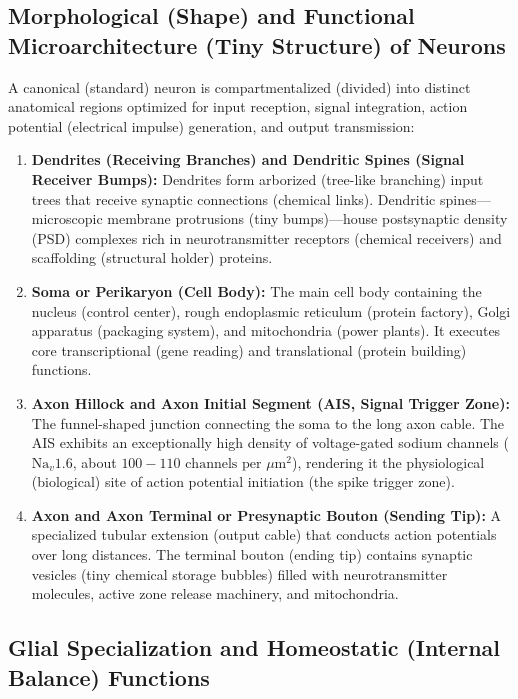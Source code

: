 \documentclass[10pt,journal,compsoc,onecolumn]{IEEEtran}
\begin{document}
\subsection{Morphological (Shape) and Functional Microarchitecture (Tiny Structure) of Neurons}

A canonical (standard) neuron is compartmentalized (divided) into distinct anatomical regions optimized for input reception, signal integration, action potential (electrical impulse) generation, and output transmission:

\begin{enumerate}
    \item \textbf{Dendrites (Receiving Branches) and Dendritic Spines (Signal Receiver Bumps):} Dendrites form arborized (tree-like branching) input trees that receive synaptic connections (chemical links). Dendritic spines—microscopic membrane protrusions (tiny bumps)—house postsynaptic density (PSD) complexes rich in neurotransmitter receptors (chemical receivers) and scaffolding (structural holder) proteins.
    \item \textbf{Soma or Perikaryon (Cell Body):} The main cell body containing the nucleus (control center), rough endoplasmic reticulum (protein factory), Golgi apparatus (packaging system), and mitochondria (power plants). It executes core transcriptional (gene reading) and translational (protein building) functions.
    \item \textbf{Axon Hillock and Axon Initial Segment (AIS, Signal Trigger Zone):} The funnel-shaped junction connecting the soma to the long axon cable. The AIS exhibits an exceptionally high density of voltage-gated sodium channels ($\text{Na}_v1.6$, about $100-110\text{ channels per }\mu\text{m}^2$), rendering it the physiological (biological) site of action potential initiation (the spike trigger zone).
    \item \textbf{Axon and Axon Terminal or Presynaptic Bouton (Sending Tip):} A specialized tubular extension (output cable) that conducts action potentials over long distances. The terminal bouton (ending tip) contains synaptic vesicles (tiny chemical storage bubbles) filled with neurotransmitter molecules, active zone release machinery, and mitochondria.
\end{enumerate}

\subsection{Glial Specialization and Homeostatic (Internal Balance) Functions}
\end{document}
